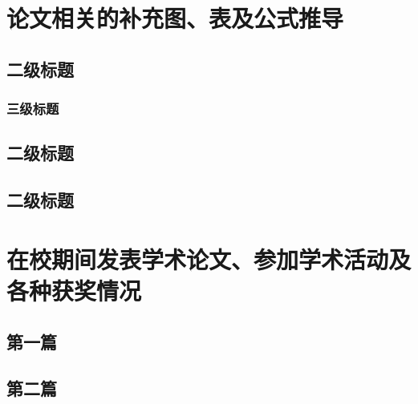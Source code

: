 \documentclass[zihao = -4,linespread = 1.38889, heading = true,no-math]{ctexbook} %
\begin{document}
\section{论文相关的补充图、表及公式推导}
\subsection{二级标题}
\zhlipsum[1]
\subsubsection{三级标题}
\zhlipsum[1]
\subsection{二级标题}
\zhlipsum[1-2]
\subsection{二级标题}
\zhlipsum[1-2]

\section{在校期间发表学术论文、参加学术活动及各种获奖情况}
\subsection{第一篇}
\zhlipsum[1]

\subsection{第二篇}
\zhlipsum[1]
\end{document}
